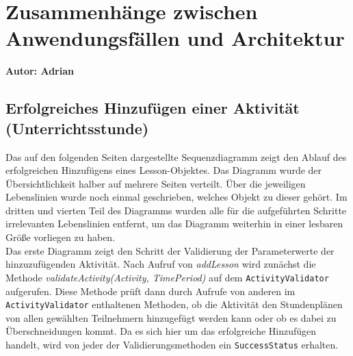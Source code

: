 \documentclass[fontsize=12pt,paper=a4,twoside]{scrartcl}
\begin{document}
\section[Zusammenhänge zwischen Anwendungsfällen und Architektur]{Zusammenhänge zwischen Anwendungsfällen und Architektur}
\label{sec:anwendungsfaelle}
\textbf{Autor: Adrian}\\

\subsection{Erfolgreiches Hinzufügen einer Aktivität (Unterrichtsstunde)}
\label{subsec:addActivitySuccess}
Das auf den folgenden Seiten dargestellte Sequenzdiagramm zeigt den Ablauf des erfolgreichen Hinzufügens eines Lesson-Objektes. Das Diagramm wurde der Übersichtlichkeit halber auf mehrere Seiten verteilt. Über die jeweiligen Lebenslinien wurde noch einmal geschrieben, welches Objekt zu dieser gehört. Im dritten und vierten Teil des Diagramms wurden alle für die aufgeführten Schritte irrelevanten Lebenslinien entfernt, um das Diagramm weiterhin in einer lesbaren Größe vorliegen zu haben. \\

Das erste Diagramm zeigt den Schritt der Validierung der Parameterwerte der hinzuzufügenden Aktivität. Nach Aufruf von \textit{addLesson} wird zunächst die Methode \textit{validateActivity(Activity, TimePeriod)} auf dem \texttt{ActivityValidator} aufgerufen. Diese Methode prüft dann durch Aufrufe von anderen im \texttt{ActivityValidator} enthaltenen Methoden, ob die Aktivität den Stundenplänen von allen gewählten Teilnehmern hinzugefügt werden kann oder ob es dabei zu Überschneidungen kommt. Da es sich hier um das erfolgreiche Hinzufügen handelt, wird von jeder der Validierungsmethoden ein \texttt{SuccessStatus} erhalten. \\
\end{document}
